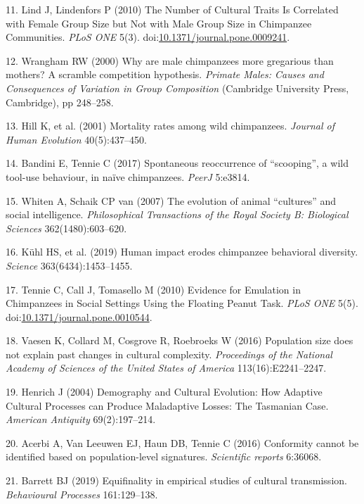 \documentclass[9pt,twocolumn,twoside,]{pnas-new}
\begin{document}
\hypertarget{ref-lind_number_2010}{}
11. Lind J, Lindenfors P (2010) The Number of Cultural Traits Is
Correlated with Female Group Size but Not with Male Group Size in
Chimpanzee Communities. \emph{PLoS ONE} 5(3).
doi:\href{https://doi.org/10.1371/journal.pone.0009241}{10.1371/journal.pone.0009241}.

\hypertarget{ref-wrangham_why_2000}{}
12. Wrangham RW (2000) Why are male chimpanzees more gregarious than
mothers? A scramble competition hypothesis. \emph{Primate Males: Causes
and Consequences of Variation in Group Composition} (Cambridge
University Press, Cambridge), pp 248--258.

\hypertarget{ref-hill_mortality_2001}{}
13. Hill K, et al. (2001) Mortality rates among wild chimpanzees.
\emph{Journal of Human Evolution} 40(5):437--450.

\hypertarget{ref-bandini_spontaneous_2017}{}
14. Bandini E, Tennie C (2017) Spontaneous reoccurrence of ``scooping'',
a wild tool-use behaviour, in naïve chimpanzees. \emph{PeerJ} 5:e3814.

\hypertarget{ref-whiten_evolution_2007}{}
15. Whiten A, Schaik CP van (2007) The evolution of animal ``cultures''
and social intelligence. \emph{Philosophical Transactions of the Royal
Society B: Biological Sciences} 362(1480):603--620.

\hypertarget{ref-kuhl_human_2019}{}
16. Kühl HS, et al. (2019) Human impact erodes chimpanzee behavioral
diversity. \emph{Science} 363(6434):1453--1455.

\hypertarget{ref-tennie_evidence_2010}{}
17. Tennie C, Call J, Tomasello M (2010) Evidence for Emulation in
Chimpanzees in Social Settings Using the Floating Peanut Task.
\emph{PLoS ONE} 5(5).
doi:\href{https://doi.org/10.1371/journal.pone.0010544}{10.1371/journal.pone.0010544}.

\hypertarget{ref-vaesen_population_2016}{}
18. Vaesen K, Collard M, Cosgrove R, Roebroeks W (2016) Population size
does not explain past changes in cultural complexity. \emph{Proceedings
of the National Academy of Sciences of the United States of America}
113(16):E2241--2247.

\hypertarget{ref-henrich_demography_2004}{}
19. Henrich J (2004) Demography and Cultural Evolution: How Adaptive
Cultural Processes can Produce Maladaptive Losses: The Tasmanian Case.
\emph{American Antiquity} 69(2):197--214.

\hypertarget{ref-acerbi_conformity_2016}{}
20. Acerbi A, Van Leeuwen EJ, Haun DB, Tennie C (2016) Conformity cannot
be identified based on population-level signatures. \emph{Scientific
reports} 6:36068.

\hypertarget{ref-barrett_equifinality_2019}{}
21. Barrett BJ (2019) Equifinality in empirical studies of cultural
transmission. \emph{Behavioural Processes} 161:129--138.



% 
\end{document}
